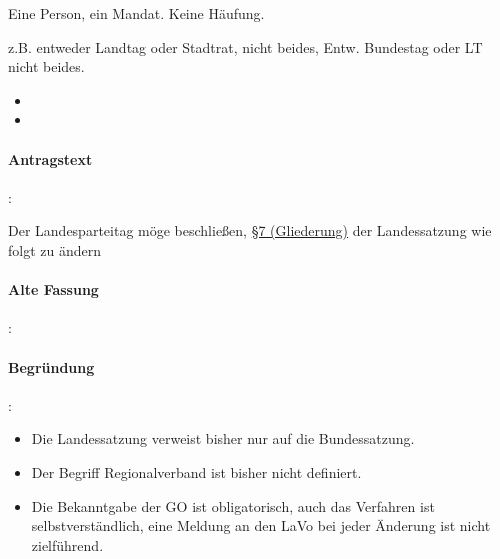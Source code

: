 Eine Person, ein Mandat. Keine Häufung.

z.B. entweder Landtag oder Stadtrat, nicht beides, Entw. Bundestag oder LT nicht beides.


\label{satzung:gliederungen3}
\begin{itemize}
\item {}
\item {}
\end{itemize}

\paragraph{Antragstext}:

Der Landesparteitag möge beschließen, \href{http://wiki.piratenpartei.de/LSA:Satzung#.C2.A7_7_-_Gliederung}{§7 (Gliederung)} der Landessatzung wie folgt zu ändern


\paragraph{Alte Fassung}:


\paragraph{Begründung}:

\begin{itemize}
\item Die Landessatzung verweist bisher nur auf die Bundessatzung.
\item Der Begriff Regionalverband ist bisher nicht definiert.
\item Die Bekanntgabe der GO ist obligatorisch, auch das Verfahren ist selbstverständlich, eine Meldung an den LaVo bei jeder Änderung ist nicht zielführend.
\end{itemize}

